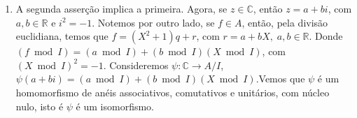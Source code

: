 \begin{exemplo}
\begin{enumerate}[left=0.5cm, align=left, nosep]
        \item A segunda asserção implica a primeira. Agora, se $z \in \mathbb{C}$, então $z = a + bi$, com $a,b \in \mathbb{R}$ 
        e $i^2 = -1$. Notemos por outro lado, se $f \in A$, então, pela divisão euclidiana, temos que  $f = (X^2 + 1)q + r$,
        com $r = a + bX, \; a,b \in \mathbb{R}$. Donde $(f \bmod I) = (a \bmod I) + (b \bmod I)(X \bmod I)$, com $(X \bmod I)^2 = -1$.
        Consideremos $\psi : \mathbb{C} \to A/I$, $\psi(a+bi) = (a \bmod I) + (b \bmod I)(X \bmod I)$.Vemos que $\psi$ é um 
        homomorfismo de anéis associativos, comutativos e unitários, com núcleo nulo, isto é $\psi$ é um isomorfismo.
    
    \end{enumerate}
\end{exemplo}
